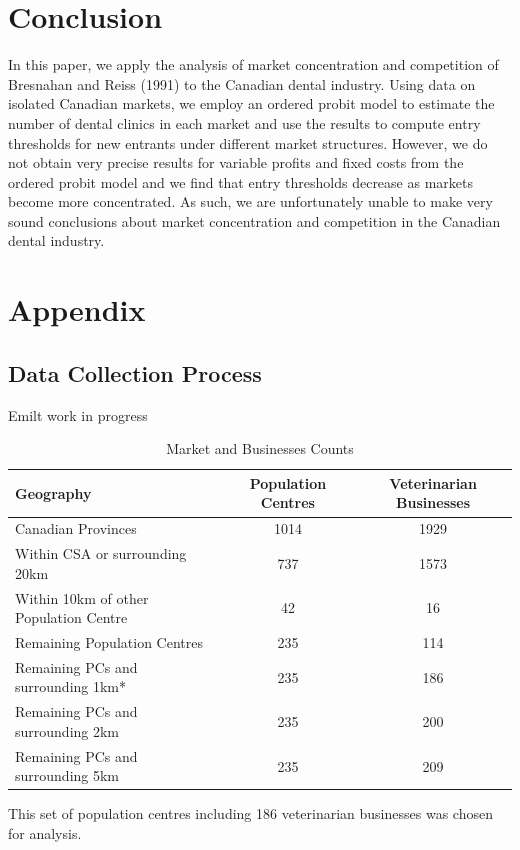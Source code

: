 \documentclass[a4paper,11pt]{article}
\begin{document}
\section{Conclusion}
In this paper, we apply the analysis of market concentration and competition of Bresnahan and Reiss (1991) to the Canadian dental industry. Using data on isolated Canadian markets, we employ an ordered probit model to estimate the number of dental clinics in each market and use the results to compute entry thresholds for new entrants under different market structures. However, we do not obtain very precise results for variable profits and fixed costs from the ordered probit model and we find that entry thresholds decrease as markets become more concentrated. As such, we are unfortunately unable to make very sound conclusions about market concentration and competition in the Canadian dental industry.

\newpage
\printbibliography

\newpage
\section*{Appendix}
\subsection*{Data Collection Process}
Emilt work in progress

\begin{table}[h]  
\begin{threeparttable}
\caption{Market and Businesses Counts} %
\centering %
\begin{tabular}{l c c } %
\hline\hline   
 Geography & Population Centres & Veterinarian Businesses   
\\ [0.5ex]  
\hline   
Canadian Provinces & 1014 & 1929 \\
Within CSA or surrounding 20km & 737 & 1573 \\
Within 10km of other Population Centre & 42 & 16 \\
Remaining Population Centres & 235 & 114 \\

Remaining PCs and surrounding 1km* & 235 & 186 \\

Remaining PCs and surrounding 2km  & 235 & 200 \\

Remaining PCs and surrounding 5km  & 235 & 209 \\

\hline %
\end{tabular}  
\begin{tablenotes}
    \small  *This set of population centres including 186 veterinarian businesses was chosen for analysis. 
\end{tablenotes}
\end{threeparttable}
\end{table}  
\end{document}
